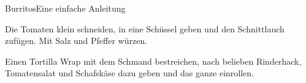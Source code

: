 \documentclass[11pt, a4paper, toc=index, twoside, DIV12]{scrbook}
\begin{document}
%
\begin{recipe}{Burritos}{Eine einfache Anleitung}
  \inglist

  \steps
  Die Tomaten klein schneiden, in eine Schüssel geben und den Schnittlauch
  zufügen. Mit Salz und Pfeffer würzen.

  Einen Tortilla Wrap mit dem Schmand bestreichen, nach belieben Rinderhack,
  Tomatensalat und Schafskäse dazu geben und das ganze einrollen.

\end{recipe}
\end{document}
